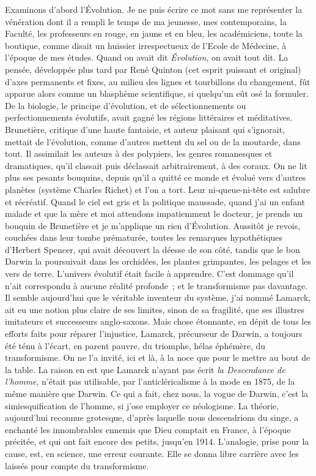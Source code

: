 \documentclass[french,twoside]{book} %
\begin{document}
Examinons d’abord l’Évolution. Je ne puis écrire ce mot sans me représenter la vénération dont il a rempli le temps de ma jeunesse, mes contemporains, la Faculté, les professeurs en rouge, en jaune et en bleu, les académiciens, toute la boutique, comme disait un huissier irrespectueux de l’Ecole de Médecine, à l’époque de mes études. Quand on avait dit {\itshape Évolution}, on avait tout dit. La pensée, développée plus tard par René Quinton (cet esprit puissant et original) d’axes permanents et fixes, au milieu des lignes et tourbillons du changement, fût apparue alors comme un blasphème scientifique, si quelqu’un eût osé la formuler. De la biologie, le principe d’évolution, et de sélectionnements ou perfectionnements évolutifs, avait gagné les régions littéraires et méditatives. Brunetière, critique d’une haute fantaisie, et auteur plaisant qui s’ignorait, mettait de l’évolution, comme d’autres mettent du sel ou de la moutarde, dans tout. Il assimilait les auteurs à des polypiers, les genres romanesques et dramatiques, qu’il classait puis déclassait arbitrairement, à des coraux. On ne lit plus ses pesants bouquins, depuis qu’il a quitté ce monde et évolué vers d’autres planètes (système Charles Richet) et l’on a tort. Leur ni-queue-ni-tête est salubre et récréatif. Quand le ciel est gris et la politique maussade, quand j’ai un enfant malade et que la mère et moi attendons impatiemment le docteur, je prends un bouquin de Brunetière et je m’applique un rien d’Évolution. Aussitôt je revois, couchées dans leur tombe prématurée, toutes les remarques hypothétiques d’Herbert Spencer, qui avait découvert la déesse de son côté, tandis que le bon Darwin la poursuivait dans les orchidées, les plantes grimpantes, les pelages et les vers de terre. L’univers évolutif était facile à apprendre. C’est dommage qu’il n’ait correspondu à aucune réalité profonde ; et le transformisme pas davantage. Il semble aujourd’hui que le véritable inventeur du système, j’ai nommé Lamarck, ait eu une notion plus claire de ses limites, sinon de sa fragilité, que ses illustres imitateurs et successeurs anglo-saxons. Mais chose étonnante, en dépit de tous les efforts faits pour réparer l’injustice, Lamarck, précurseur de Darwin, a toujours été ténu à l’écart, en parent pauvre, du triomphe, hélas éphémère, du transformisme. On ne l’a invité, ici et là, à la noce que pour le mettre au bout de la table. La raison en est que Lamarck n’ayant pas écrit {\itshape la Descendance de l’homme}, n’était pas utilisable, par l’anticléricalisme à la mode en 1875, de la même manière que Darwin. Ce qui a fait, chez nous, la vogue de Darwin, c’est la simiesquification de l’homme, si j’ose employer ce néologisme. La théorie, aujourd’hui reconnue grotesque, d’après laquelle nous descendrions du singe, a enchanté les innombrables ennemis que Dieu comptait en France, à l’époque précitée, et qui ont fait encore des petits, jusqu’en 1914. L’analogie, prise pour la cause, est, en science, une erreur courante. Elle se donna libre carrière avec les laissés pour compte du transformisme.\par
\end{document}
